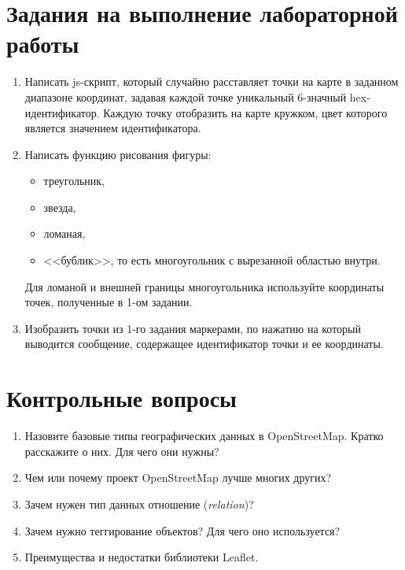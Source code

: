 \newpage

\chapter{Задания на выполнение лабораторной работы}
\begin{enumerate}
    \item Написать js-скрипт, который случайно расставляет точки на карте 
        в заданном диапазоне координат, задавая каждой точке уникальный 
        6-значный hex-идентификатор. Каждую точку отобразить на карте 
        кружком, цвет которого является значением идентификатора.
    \item Написать функцию рисования фигуры:
    \begin{itemize}
        \item треугольник,
        \item звезда,
        \item ломаная,
        \item <<бублик>>, то есть многоугольник с вырезанной областью внутри.
    \end{itemize}
    Для ломаной и внешней границы многоугольника используйте координаты точек,
    полученные в 1-ом задании.
    \item Изобразить точки из 1-го задания маркерами, по нажатию на который 
        выводится сообщение, содержащее идентификатор точки и ее координаты.
\end{enumerate}

\newpage

\chapter{Контрольные вопросы}
\begin{enumerate}
    \item Назовите базовые типы географических данных в OpenStreetMap. 
        Кратко расскажите о них. Для чего они нужны?
    \item Чем или почему проект OpenStreetMap лучше многих других?
    \item Зачем нужен тип данных отношение (\emph{relation})?
    \item Зачем нужно теггирование объектов? Для чего оно используется?
    \item Преимущества и недостатки библиотеки Leaflet.
\end{enumerate}

\newpage

